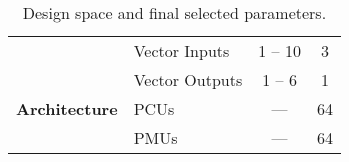 \begin{table}[]
{\begin{tabular}{llcc}
	                    & Vector Inputs           & 1 -- 10                    & 3                    \\
	                    & Vector Outputs          & 1 -- 6                     & 1                    \\ \midrule
\textbf{Architecture} & PCUs                    & ---                        & 64                   \\
	                    & PMUs                    & ---                        & 64                   \\
\bottomrule
\end{tabular}
}
\caption{Design space and final selected parameters.}
\label{t-parameters}
\vspace{-20pt}
\end{table}
